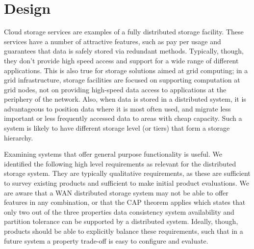 \documentclass[11pt]{article}
\begin{document}
\section{Design}

Cloud storage services are examples of a fully distributed storage 
facility. These services have a number of attractive features, such 
as pay per usage and guarantees that data is safely stored via 
redundant methods. Typically, though, they don't provide high speed 
access and support for a wide range of different applications. This 
is also true for storage solutions aimed at grid computing; in a grid 
infrastructure, storage facilities are focused on supporting computation 
at grid nodes, not on providing high-speed data access to applications at 
the periphery  of the network.  Also, when data is stored in a distributed 
system, it is advantageous to position data where it is most often used, 
and migrate less important or less frequently accessed data to areas with 
cheap capacity. Such a system is likely to have different storage level 
(or tiers) that form a storage hierarchy. 

Examining systems that offer general purpose functionality is useful. We 
identified the following high level requirements as relevant for the 
distributed storage system. They are typically qualitative requirements, 
as these are sufficient to survey existing products and sufficient to make 
initial product evaluations. We are aware that a WAN distributed storage 
system may not be able to offer features in any combination, or that the 
CAP theorem applies which states that only two out of the three properties 
data consistency system availability and partition tolerance can be 
supported by a distributed system. Ideally, though, products should be able 
to explicitly balance these requirements, such that in a future system a 
property trade-off is easy to configure and evaluate.
\end{document}
